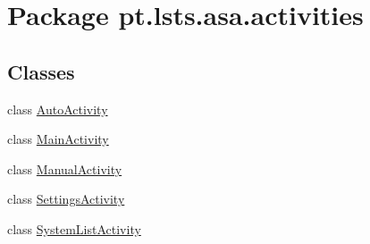 \hypertarget{namespacept_1_1lsts_1_1asa_1_1activities}{}\section{Package pt.\+lsts.\+asa.\+activities}
\label{namespacept_1_1lsts_1_1asa_1_1activities}
\subsection*{Classes}
\begin{DoxyCompactItemize}
\item 
class \hyperlink{classpt_1_1lsts_1_1asa_1_1activities_1_1AutoActivity}{Auto\+Activity}
\item 
class \hyperlink{classpt_1_1lsts_1_1asa_1_1activities_1_1MainActivity}{Main\+Activity}
\item 
class \hyperlink{classpt_1_1lsts_1_1asa_1_1activities_1_1ManualActivity}{Manual\+Activity}
\item 
class \hyperlink{classpt_1_1lsts_1_1asa_1_1activities_1_1SettingsActivity}{Settings\+Activity}
\item 
class \hyperlink{classpt_1_1lsts_1_1asa_1_1activities_1_1SystemListActivity}{System\+List\+Activity}
\end{DoxyCompactItemize}
